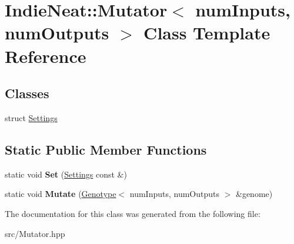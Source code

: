 \hypertarget{class_indie_neat_1_1_mutator}{}\section{Indie\+Neat\+:\+:Mutator$<$ num\+Inputs, num\+Outputs $>$ Class Template Reference}
\label{class_indie_neat_1_1_mutator}
\subsection*{Classes}
\begin{DoxyCompactItemize}
\item 
struct \hyperlink{struct_indie_neat_1_1_mutator_1_1_settings}{Settings}
\end{DoxyCompactItemize}
\subsection*{Static Public Member Functions}
\begin{DoxyCompactItemize}
\item 
\mbox{\label{class_indie_neat_1_1_mutator_a014b3a1f3d263c29a592b3de860edfc7}} 
static void {\bfseries Set} (\hyperlink{struct_indie_neat_1_1_mutator_1_1_settings}{Settings} const \&)
\item 
\mbox{\label{class_indie_neat_1_1_mutator_ac05b3a048e9b0626aa0d40538ce8db4c}} 
static void {\bfseries Mutate} (\hyperlink{class_indie_neat_1_1_genotype}{Genotype}$<$ num\+Inputs, num\+Outputs $>$ \&genome)
\end{DoxyCompactItemize}


The documentation for this class was generated from the following file\+:\begin{DoxyCompactItemize}
\item 
src/Mutator.\+hpp\end{DoxyCompactItemize}
